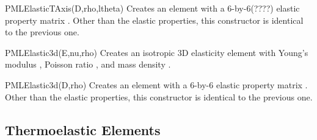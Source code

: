 \begin{codelist}
  \item[PMLElasticTAxis(D,rho,ltheta)]
    Creates an element with a 6-by-6(????) elastic property matrix
    .  Other than the elastic properties, this constructor
    is identical to the previous one.

  \item[PMLElastic3d(E,nu,rho)] 
    Creates an isotropic 3D elasticity element with Young's modulus
    , Poisson ratio , and mass density
    .  

  \item[PMLElastic3d(D,rho)]
    Creates an element with a 6-by-6 elastic property matrix
    .  Other than the elastic properties, this constructor
    is identical to the previous one.

\end{codelist}

\clearpage
\subsection{Thermoelastic Elements}


